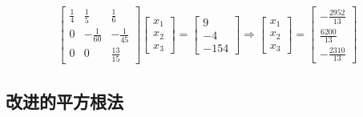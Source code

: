\[
\begin{aligned}
    \left[
    \begin{array}{ccc}
        \frac{1}{4} & \frac{1}{5} & \frac{1}{6} \\
        0 & -\frac{1}{60} & -\frac{1}{45} \\
        0 & 0 & \frac{13}{15}
    \end{array}
    \right]
    \left[
    \begin{array}{c}
        x_1  \\
        x_2  \\
        x_3 
    \end{array}
    \right]
    =
    \left[
    \begin{array}{c}
        9  \\
        -4  \\
        -154 
    \end{array}
    \right]
    \Rightarrow{}
    \left[
    \begin{array}{c}
        x_1  \\
        x_2  \\
        x_3 
    \end{array}
    \right]
    =
    \left[
    \begin{array}{c}
        -\frac{2952}{13}  \\
        \frac{6200}{13}  \\
        -\frac{2310}{13} 
    \end{array}
    \right]
\end{aligned}
\]

\subsection{改进的平方根法}

